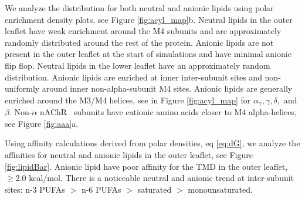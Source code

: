 \documentclass[preprint,3p,9pt,times,onecolumn]{elsarticle}
\newcommand{\liam}[1]{\textcolor{cyan}{#1}}
\newcommand{\notsure}[1]{\textcolor{red}{#1}}
\newcommand{\nachr}{nAChR}
\begin{document}
We analyze the distribution for both neutral and anionic lipids using polar enrichment density plots, see Figure \ref{fig:acyl_map}b. Neutral lipids in the outer leaflet have weak enrichment around the M4 subunits and are approximately randomly distributed around the rest of the protein. Anionic lipids are not present in the outer leaflet at the start of simulations and have minimal anionic flip flop. Neutral lipids in the lower leaflet have an approximately random distribution. Anionic lipids are enriched at inner inter-subunit sites and non-uniformly around inner non-alpha-subunit M4 sites. Anionic lipids are generally enriched around the M3/M4 helices, see in Figure \ref{fig:acyl_map} for $\alpha_{\gamma}, \gamma,\delta,$ and $\beta$. Non-$\alpha$ \nachr~ subunits have cationic amino acids closer to M4 alpha-helices, see Figure \ref{fig:aaa}a.


Using affinity calculations derived from polar densities, eq \ref{eq:dG}, we analyze the affinities for neutral and anionic lipids in the outer leaflet, see Figure \ref{fig:lipidBar}. Anionic lipid have poor affinity for the TMD in the outer leaflet, $\geq 2.0$ kcal/mol. There is a noticeable neutral and anionic trend at inter-subunit sites: n-3 PUFAs $>$ n-6 PUFAs $>$ saturated $>$ monounsaturated.  %
\end{document}
